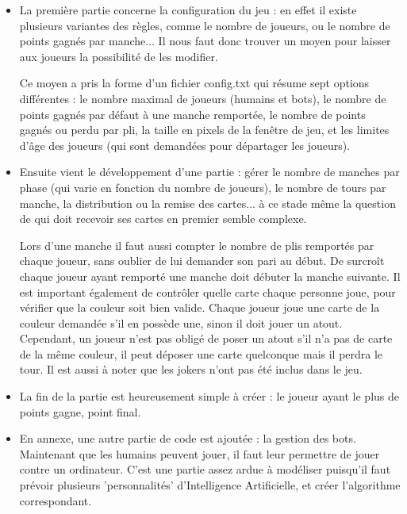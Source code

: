 \documentclass[12pt]{report}
\begin{document}
	\begin{itemize}[label=\textbullet, font=\LARGE]
		\item La première partie concerne la configuration du jeu : en effet il existe plusieurs variantes des règles, comme le nombre de joueurs, ou le nombre de points gagnés par manche... Il nous faut donc trouver un moyen pour laisser aux joueurs la possibilité de les modifier.
		
		Ce moyen a pris la forme d'un fichier config.txt qui résume sept options différentes : le nombre maximal de joueurs (humains et bots), le nombre de points gagnés par défaut à une manche remportée, le nombre de points gagnés ou perdu par pli, la taille en pixels de la fenêtre de jeu, et les limites d'âge des joueurs (qui sont demandées pour départager les joueurs).\\
		
		\item Ensuite vient le développement d'une partie : gérer le nombre de manches par phase (qui varie en fonction du nombre de joueurs), le nombre de tours par manche, la distribution ou la remise des cartes... à ce stade même la question de qui doit recevoir ses cartes en premier semble complexe.
		
		Lors d'une manche il faut aussi compter le nombre de plis remportés par chaque joueur, sans oublier de lui demander son pari au début. De surcroît chaque joueur ayant remporté une manche doit débuter la manche suivante. Il est important également de contrôler quelle carte chaque personne joue, pour vérifier que la couleur soit bien valide. Chaque joueur joue une carte de la couleur demandée s'il en possède une, sinon il doit jouer un atout. Cependant, un joueur n'est pas obligé de poser un atout s'il n'a pas de carte de la même couleur, il peut déposer une carte quelconque mais il perdra le tour. Il est aussi à noter que les jokers n'ont pas été inclus dans le jeu.\\
		
		\item La fin de la partie est heureusement simple à créer : le joueur ayant le plus de points gagne, point final.\\

		\item En annexe, une autre partie de code est ajoutée : la gestion des bots. Maintenant que les humains peuvent jouer, il faut leur permettre de jouer contre un ordinateur. C'est une partie assez ardue à modéliser puisqu'il faut prévoir plusieurs 'personnalités' d'Intelligence Artificielle, et créer l'algorithme correspondant.
	\end{itemize}
	
\end{document}
